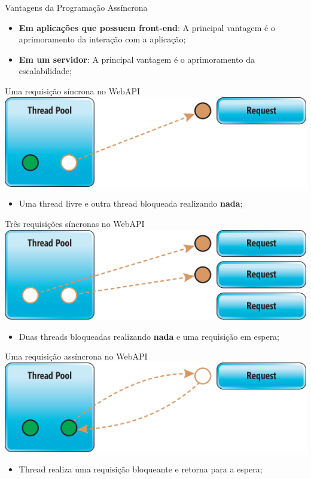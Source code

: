 \documentclass[10pt]{beamer}
\begin{document}
\begin{frame}{Vantagens da Programação Assíncrona}
	\begin{itemize}
		\item \textbf{Em aplicações que possuem front-end}: A principal vantagem é o aprimoramento da interação com a aplicação; 
		\item \textbf{Em um servidor}: A principal vantagem é o aprimoramento da escalabilidade;
	\end{itemize}
\end{frame}

\begin{frame}{Uma requisição síncrona no WebAPI}
	\includegraphics[width=\textwidth]{imgs/sync1}
	\begin{itemize}
		\item Uma thread livre e outra thread bloqueada realizando \textbf{nada};
	\end{itemize}
\end{frame}

\begin{frame}{Três requisições síncronas no WebAPI}
	\includegraphics[width=\textwidth]{imgs/sync2}
	\begin{itemize}
		\item Duas threads bloqueadas realizando \textbf{nada} e uma requisição em espera;
	\end{itemize}
\end{frame}

\begin{frame}{Uma requisição assíncrona no WebAPI}
	\includegraphics[width=\textwidth]{imgs/async}
	\begin{itemize}
		\item Thread realiza uma requisição bloqueante e retorna para a espera;
	\end{itemize}
\end{frame}
\end{document}
